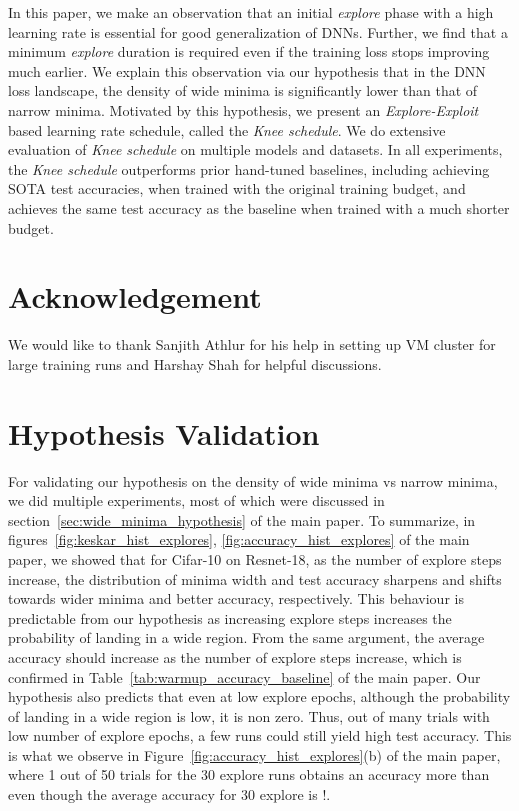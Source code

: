 \documentclass{article} \usepackage{iclr2021_conference,times}
\newcommand{\lrschedule}{\textit{Knee schedule}}
\begin{document}
In this paper, we make an observation that an initial \textit{explore} phase with a high learning rate is essential for good generalization of DNNs. Further, we find that a minimum \textit{explore} duration is required even if the training loss stops improving much earlier. We explain this observation via our hypothesis that in the DNN loss landscape, the density of wide minima is significantly lower than that of narrow minima. 
Motivated by this hypothesis, we present an \textit{Explore-Exploit} based learning rate schedule, called the \lrschedule{}. We do extensive evaluation of \lrschedule{} on multiple models and datasets. In all experiments, the \lrschedule{} outperforms prior hand-tuned baselines, including achieving SOTA test accuracies, when trained with the original training budget, and achieves the same test accuracy as the baseline when trained with a much shorter budget.

 \section{Acknowledgement}
\label{sec:acknowledgement}

We would like to thank Sanjith Athlur for his help in setting up VM cluster for large training runs and Harshay Shah for helpful discussions.
 


\clearpage

\appendix

\section{Hypothesis Validation}
\label{sec:hypothesis_validation}

For validating our hypothesis on the density of wide minima vs narrow minima, we did multiple experiments, most of which were discussed in section~\ref{sec:wide_minima_hypothesis} of the main paper.
To summarize, in figures~\ref{fig:keskar_hist_explores}, \ref{fig:accuracy_hist_explores} of the main paper, we showed that for Cifar-10 on Resnet-18, as the number of explore steps increase, the distribution of minima width and test accuracy sharpens and shifts towards wider minima and better accuracy, respectively. This behaviour is predictable from our hypothesis as increasing explore steps increases the probability of landing in a wide region. From the same argument, the average accuracy should increase as the number of explore steps increase, which is confirmed in Table~\ref{tab:warmup_accuracy_baseline} of the main paper. Our hypothesis also predicts that even at low explore epochs, although the probability of landing in a wide region is low, it is non zero. Thus, out of many trials with low number of explore epochs, a few runs could still yield high test accuracy. This is what we observe in Figure~\ref{fig:accuracy_hist_explores}(b) of the main paper, where 1 out of 50 trials for the 30 explore runs obtains an accuracy more than  even though the average accuracy for 30 explore is !.
\end{document}
